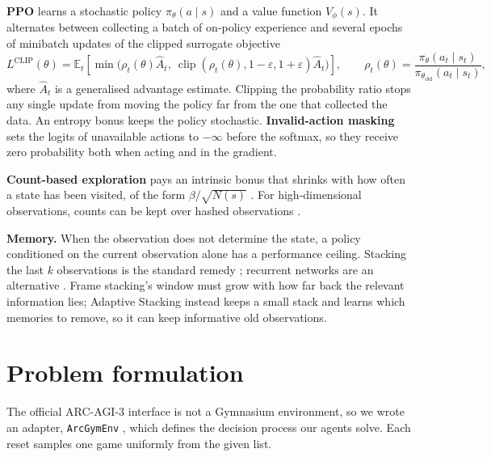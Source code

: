 \documentclass[10pt]{article}
\begin{document}
\textbf{PPO} \citep{schulman2017proximal} learns a stochastic policy $\pi_\theta(a\mid s)$ and a value function $V_\phi(s)$. It alternates between collecting a batch of on-policy experience and several epochs of minibatch updates of the clipped surrogate objective
\begin{equation}
L^{\text{CLIP}}(\theta) = \mathbb{E}_t\!\left[\min\!\big(\rho_t(\theta)\hat A_t,\ \operatorname{clip}(\rho_t(\theta), 1-\varepsilon, 1+\varepsilon)\hat A_t\big)\right],
\qquad \rho_t(\theta)=\frac{\pi_\theta(a_t\mid s_t)}{\pi_{\theta_\text{old}}(a_t\mid s_t)},
\end{equation}
where $\hat A_t$ is a generalised advantage estimate. Clipping the probability ratio stops any single update from moving the policy far from the one that collected the data. An entropy bonus keeps the policy stochastic. \textbf{Invalid-action masking} \citep{huang2022closer} sets the logits of unavailable actions to $-\infty$ before the softmax, so they receive zero probability both when acting and in the gradient.

\textbf{Count-based exploration} pays an intrinsic bonus that shrinks with how often a state has been visited, of the form $\beta/\sqrt{N(s)}$ \citep{strehl2008analysis, bellemare2016unifying}. For high-dimensional observations, counts can be kept over hashed observations \citep{tang2017exploration}.

\textbf{Memory.} When the observation does not determine the state, a policy conditioned on the current observation alone has a performance ceiling. Stacking the last $k$ observations is the standard remedy \citep{mnih2015human}; recurrent networks are an alternative \citep{hausknecht2015deep}. Frame stacking's window must grow with how far back the relevant information lies; Adaptive Stacking \citep{nanguetasse2025beyond} instead keeps a small stack and learns which memories to remove, so it can keep informative old observations.

\section{Problem formulation}
\label{sec:formulation}

The official ARC-AGI-3 interface is not a Gymnasium environment, so we wrote an adapter, \texttt{ArcGymEnv} \citep{towers2024gymnasium}, which defines the decision process our agents solve. Each reset samples one game uniformly from the given list.
\end{document}
